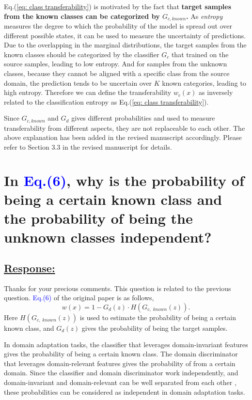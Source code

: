 Eq.(\ref{eq: class transferability}) is motivated by the fact that \textbf{target samples from the known classes can be categorized by $G_{c, known}$.}
As \textit{entropy} measures the degree to which the probability of the model is spread out over different possible states, it can be used to measure the uncertainty of predictions. 
Due to the overlapping in the marginal distributions, the target samples from the known classes should be categorized by the classifier $G_c$ that trained on the source samples, leading to low entropy.
And for samples from the unknown classes, because they cannot be aligned with a specific class from the source domain, the prediction tends to be uncertain over $K$ known categories, leading to high entropy.
Therefore we can define the transferability $w_c(x)$ as inversely related to the classification entropy as Eq.(\ref{eq: class transferability}).

Since $G_{c,known}$ and $G_d$ gives different probabilities and used to measure transferability from different aspects, they are not replaceable to each other. 
The above explanation has been added in the revised manuscript accordingly. 
Please refer to Section 3.3 in the revised manuscript for details. 


\section{In \textcolor{blue}{Eq.(6)}, why is the probability of being a certain known class and the probability of being the unknown classes independent? }

\subsection*{\underline{\textbf{Response:}}}


Thanks for your precious comments. 
This question is related to the previous question.
\textcolor{blue}{Eq.(6)} of the original paper is as follows, 
\begin{equation}
    \label{eq: transferability}
    w(x)=1-G_d(z)\cdot H(G_{c,\; known}(z)).
\end{equation} 
Here $H(G_{c,\; known}(z))$ is used to estimate the probability of being a certain known class, and $G_d(z)$ gives the probability of being the target samples.

In domain adaptation tasks, the classifier that leverages domain-invariant features gives the probability of being a certain known class.
The domain discriminator that leverages domain-relevant features gives the probability of from a certain domain.
Since the classifier and domain discriminator work independently, and domain-invariant and domain-relevant can be well separated from each other \cite{DomainAgnostic}, these probabilities can be considered as independent in domain adaptation tasks.

